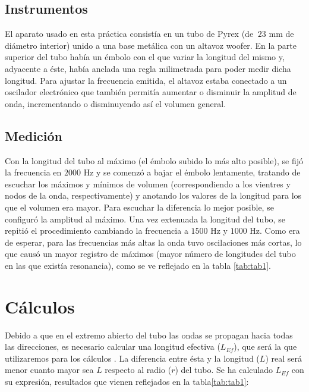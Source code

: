 \documentclass[fleqn,usenatbib,openbib]{mnras}
\begin{document}
\subsection{Instrumentos}

El aparato usado en esta práctica consistía en un tubo de Pyrex (de $~23$ mm de diámetro interior) unido a una base metálica con un altavoz woofer. En la parte superior del tubo había un émbolo con el que variar la longitud del mismo y, adyacente a éste, había anclada una regla milimetrada para poder medir dicha longitud. Para ajustar la frecuencia emitida, el altavoz estaba conectado a un oscilador electrónico que también permitía aumentar o disminuir la amplitud de onda, incrementando o disminuyendo así el volumen general.



\subsection{Medición}

Con la longitud del tubo al máximo (el émbolo subido lo más alto posible), se fijó la frecuencia en $2000$ Hz y se comenzó a bajar el émbolo lentamente, tratando de escuchar los máximos y mínimos de volumen (correspondiendo a los vientres y nodos de la onda, respectivamente) y anotando los valores de la longitud para los que el volumen era mayor. Para escuchar la diferencia lo mejor posible, se configuró la amplitud al máximo. Una vez extenuada la longitud del tubo, se repitió el procedimiento cambiando la frecuencia a $1500$ Hz y $1000$ Hz. Como era de esperar, para las frecuencias más altas la onda tuvo oscilaciones más cortas, lo que causó un mayor registro de máximos (mayor número de longitudes del tubo en las que existía resonancia), como se ve reflejado en la tabla \cref{tab:tab1}.



\section{Cálculos}

Debido a que en el extremo abierto del tubo las ondas se propagan hacia todas las direcciones, es necesario calcular una longitud efectiva ($L_{Ef}$), que será la que utilizaremos para los cálculos \cite{labuam}. La diferencia entre ésta y la longitud ($L$) real será menor cuanto mayor sea $L$ respecto al radio ($r$) del tubo. Se ha calculado $L_{Ef}$ con su expresión, resultados que vienen reflejados en la tabla\cref{tab:tab1}:
\end{document}
